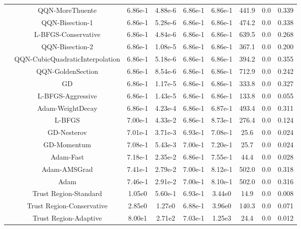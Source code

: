 \documentclass[11pt]{article}
\begin{document}
{\begin{longtable}{l*{8}{S[table-format=2.2e-1]}}
 & QQN-MoreThuente & 6.86e-1 & 4.88e-6 & 6.86e-1 & 6.86e-1 & 441.9 & 0.0 & 0.339 \\
 & QQN-Bisection-1 & 6.86e-1 & 5.28e-6 & 6.86e-1 & 6.86e-1 & 474.2 & 0.0 & 0.338 \\
 & L-BFGS-Conservative & 6.86e-1 & 4.84e-6 & 6.86e-1 & 6.86e-1 & 639.5 & 0.0 & 0.268 \\
 & QQN-Bisection-2 & 6.86e-1 & 1.08e-5 & 6.86e-1 & 6.86e-1 & 367.1 & 0.0 & 0.200 \\
 & QQN-CubicQuadraticInterpolation & 6.86e-1 & 5.18e-6 & 6.86e-1 & 6.86e-1 & 394.2 & 0.0 & 0.355 \\
 & QQN-GoldenSection & 6.86e-1 & 8.54e-6 & 6.86e-1 & 6.86e-1 & 712.9 & 0.0 & 0.242 \\
 & GD & 6.86e-1 & 1.17e-5 & 6.86e-1 & 6.86e-1 & 333.8 & 0.0 & 0.327 \\
 & L-BFGS-Aggressive & 6.86e-1 & 1.43e-5 & 6.86e-1 & 6.86e-1 & 133.8 & 0.0 & 0.055 \\
 & Adam-WeightDecay & 6.86e-1 & 4.23e-4 & 6.86e-1 & 6.87e-1 & 493.4 & 0.0 & 0.311 \\
 & L-BFGS & 7.00e-1 & 4.33e-2 & 6.86e-1 & 8.73e-1 & 276.4 & 0.0 & 0.124 \\
 & GD-Nesterov & 7.01e-1 & 3.71e-3 & 6.93e-1 & 7.08e-1 & 25.6 & 0.0 & 0.024 \\
 & GD-Momentum & 7.08e-1 & 5.43e-3 & 7.00e-1 & 7.20e-1 & 25.7 & 0.0 & 0.024 \\
 & Adam-Fast & 7.18e-1 & 2.35e-2 & 6.86e-1 & 7.55e-1 & 44.4 & 0.0 & 0.028 \\
 & Adam-AMSGrad & 7.41e-1 & 2.79e-2 & 7.00e-1 & 8.12e-1 & 502.0 & 0.0 & 0.318 \\
 & Adam & 7.46e-1 & 2.91e-2 & 7.00e-1 & 8.10e-1 & 502.0 & 0.0 & 0.316 \\
 & Trust Region-Standard & 1.05e0 & 5.60e-1 & 6.93e-1 & 3.44e0 & 14.9 & 0.0 & 0.008 \\
 & Trust Region-Conservative & 2.85e0 & 1.27e0 & 6.88e-1 & 3.96e0 & 140.3 & 0.0 & 0.071 \\
 & Trust Region-Adaptive & 8.00e1 & 2.71e2 & 7.03e-1 & 1.25e3 & 24.4 & 0.0 & 0.012 \\
\midrule
\end{longtable}
}
\end{document}
